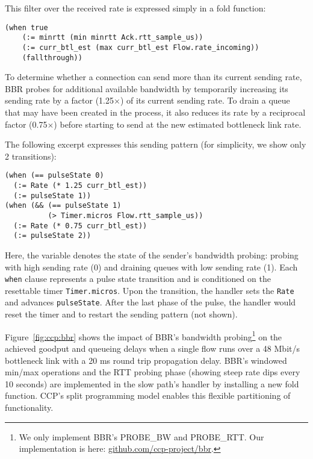 This filter over the received rate is expressed simply in a fold function:
{\footnotesize
\begin{verbatim}
(when true
    (:= minrtt (min minrtt Ack.rtt_sample_us))
    (:= curr_btl_est (max curr_btl_est Flow.rate_incoming))
    (fallthrough))
\end{verbatim}
}

To determine whether a connection can send more than its current sending rate,
BBR probes for additional available bandwidth by temporarily increasing its
sending rate by a factor (1.25$\times$) of its current sending rate.
%
To drain a queue that may have been created in the process, it also reduces its
rate by a reciprocal factor (0.75$\times$) before starting to send at the new estimated
bottleneck link rate.

The following excerpt expresses this sending pattern (for simplicity, we show only 2 transitions):
{\footnotesize
\begin{verbatim}
(when (== pulseState 0)
  (:= Rate (* 1.25 curr_btl_est))
  (:= pulseState 1))
(when (&& (== pulseState 1) 
          (> Timer.micros Flow.rtt_sample_us))
  (:= Rate (* 0.75 curr_btl_est))
  (:= pulseState 2))
\end{verbatim}
}

Here, the variable  denotes the state of the sender's
bandwidth probing: probing with high sending rate (0) and draining queues with low
sending rate (1).
Each \texttt{when} clause represents a pulse state transition and is conditioned on the
resettable timer \texttt{Timer.micros}.
Upon the transition, the handler sets the \texttt{Rate} and advances \texttt{pulseState}.
After the last phase of the pulse, the handler would reset the timer and  to restart the sending pattern (not shown).

Figure~\ref{fig:ccp:bbr} shows
the impact of BBR's bandwidth probing\footnote{We only implement BBR's PROBE\_BW and PROBE\_RTT. Our implementation is here: \url{github.com/ccp-project/bbr}.} on the
achieved goodput and queueing delays when a single flow runs over a 48 Mbit/s
bottleneck link with a 20 ms round trip propagation delay.
%
BBR's windowed min/max operations and the RTT probing phase (showing steep rate
dips every 10 seconds) are implemented in the slow path's 
handler by installing a new fold function.
%
CCP's split programming model enables this flexible partitioning of functionality.

